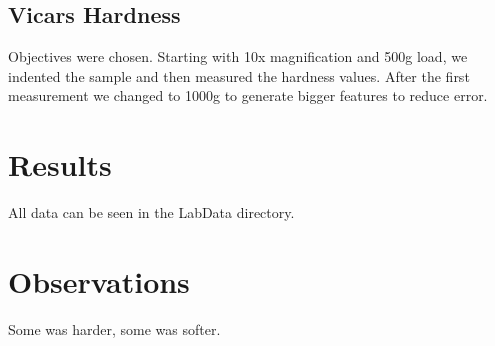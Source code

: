 \documentclass{article}
\begin{document}
\subsection{Vicars Hardness}

Objectives were chosen. Starting with 10x magnification and 500g load, we indented the sample and then measured the hardness values. After the first measurement we changed to 1000g to generate bigger features to reduce error.
\section{Results}

All data can be seen in the LabData directory.
\section{Observations}

Some was harder, some was softer.
\end{document}
